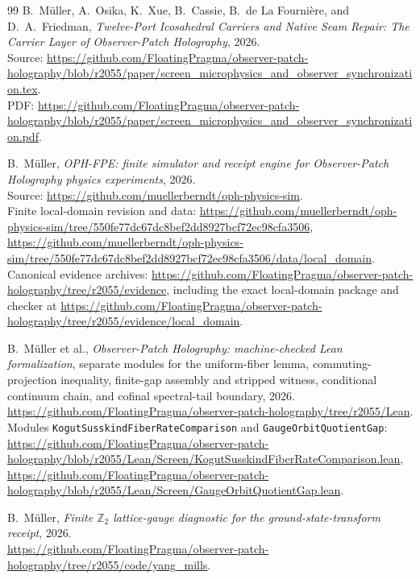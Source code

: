 \documentclass[11pt]{article}
\numberwithin{equation}{section}
\theoremstyle{remark}
\begin{document}
\begin{thebibliography}{99}
B.~M\"uller, A.~Osika, K.~Xue, B.~Cassie, B.~de La Fourni\`ere, and D.~A.~Friedman,
\emph{Twelve-Port Icosahedral Carriers and Native Seam Repair: The Carrier Layer of Observer-Patch Holography},
2026.\\
Source: \url{https://github.com/FloatingPragma/observer-patch-holography/blob/r2055/paper/screen_microphysics_and_observer_synchronization.tex}.\\
PDF: \url{https://github.com/FloatingPragma/observer-patch-holography/blob/r2055/paper/screen_microphysics_and_observer_synchronization.pdf}.

B.~M\"uller,
\emph{OPH-FPE: finite simulator and receipt engine for Observer-Patch
Holography physics experiments},
2026.\\
Source: \url{https://github.com/muellerberndt/oph-physics-sim}.\\
Finite local-domain revision and data:
\url{https://github.com/muellerberndt/oph-physics-sim/tree/550fe77dc67dc8bef2dd8927bcf72ec98cfa3506},
\url{https://github.com/muellerberndt/oph-physics-sim/tree/550fe77dc67dc8bef2dd8927bcf72ec98cfa3506/data/local_domain}.\\
Canonical evidence archives:
\url{https://github.com/FloatingPragma/observer-patch-holography/tree/r2055/evidence}, including the exact
local-domain package and checker at
\url{https://github.com/FloatingPragma/observer-patch-holography/tree/r2055/evidence/local_domain}.

B.~M\"uller et al.,
\emph{Observer-Patch Holography: machine-checked Lean formalization},
separate modules for the uniform-fiber lemma, commuting-projection inequality,
finite-gap assembly and stripped witness, conditional continuum chain, and
cofinal spectral-tail boundary,
2026.\\
\url{https://github.com/FloatingPragma/observer-patch-holography/tree/r2055/Lean}.\\
Modules \texttt{KogutSusskindFiberRateComparison} and \texttt{GaugeOrbitQuotientGap}:
\url{https://github.com/FloatingPragma/observer-patch-holography/blob/r2055/Lean/Screen/KogutSusskindFiberRateComparison.lean},
\url{https://github.com/FloatingPragma/observer-patch-holography/blob/r2055/Lean/Screen/GaugeOrbitQuotientGap.lean}.

B.~M\"uller,
\emph{Finite \(\mathbb Z_2\) lattice-gauge diagnostic for the ground-state-transform receipt},
2026.\\
\url{https://github.com/FloatingPragma/observer-patch-holography/tree/r2055/code/yang_mills}.


\end{thebibliography}
\end{document}
